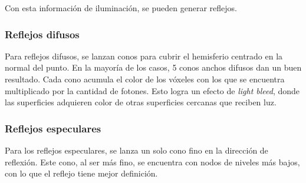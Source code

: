 Con esta información de iluminación, se pueden generar reflejos.

\subsubsection{Reflejos difusos}

Para reflejos difusos, se lanzan conos para cubrir el hemisferio centrado en la normal del punto.
En la mayoría de los casos, 5 conos anchos difusos dan un buen resultado.
Cada cono acumula el color de los vóxeles con los que se encuentra multiplicado por la cantidad de fotones.
Esto logra un efecto de \textit{light bleed}, donde las superficies adquieren color de otras superficies cercanas que reciben luz.

\subsubsection{Reflejos especulares}

Para los reflejos especulares, se lanza un solo cono fino en la dirección de reflexión.
Este cono, al ser más fino, se encuentra con nodos de niveles más bajos, con lo que el reflejo tiene mejor definición.





